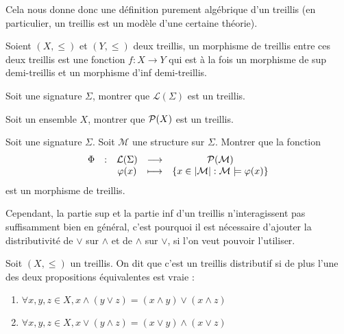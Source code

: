 Cela nous donne donc une définition purement algébrique d'un treillis (en
particulier, un treillis est un modèle d'une certaine théorie).

\begin{definition}
  Soient $(X,\leq)$ et $(Y,\leq)$ deux treillis, un morphisme de treillis entre
  ces deux treillis est une fonction $f : X \to Y$ qui est à la fois un
  morphisme de sup demi-treillis et un morphisme d'inf demi-treillis.
\end{definition}

\begin{exercise}
  Soit une signature $\Sigma$, montrer que $\mathcal L(\Sigma)$ est un treillis.
\end{exercise}

\begin{exercise}
  Soit un ensemble $X$, montrer que $\mathcal{P} (X)$ est un treillis.
\end{exercise}

\begin{exercise}
  Soit une signature $\Sigma$. Soit $\mathcal M$ une structure sur $\Sigma$.
  Montrer que la fonction
  \[\begin{array}{ccccc}
  \Phi & : & \mathcal L(\Sigma) & \longrightarrow &
  \mathcal{P}(\mathcal M)\\
  & & \varphi(x) & \longmapsto &
  \{x \in |\mathcal M| : \mathcal M\models \varphi(x)\}
  \end{array}\]
  est un morphisme de treillis.
\end{exercise}

Cependant, la partie sup et la partie inf d'un treillis n'interagissent pas
suffisamment bien en général, c'est pourquoi il est nécessaire d'ajouter la
distributivité de $\lor$ sur $\land$ et de $\land$ sur $\lor$, si l'on veut
pouvoir l'utiliser.

\begin{definition}
  Soit $(X,\leq)$ un treillis. On dit que c'est un treillis distributif si de
  plus l'une des deux propositions équivalentes est vraie :
  \begin{enumerate}[label=(\roman*)]
  \item \label{enum.tr.distr1}
    $\forall x,y,z\in X, x\land (y\lor z) = (x\land y)\lor (x\land z)$
  \item \label{enum.tr.distr2}
    $\forall x,y,z\in X, x\lor (y\land z) = (x\lor y)\land (x\lor z)$
  \end{enumerate}
\end{definition}

